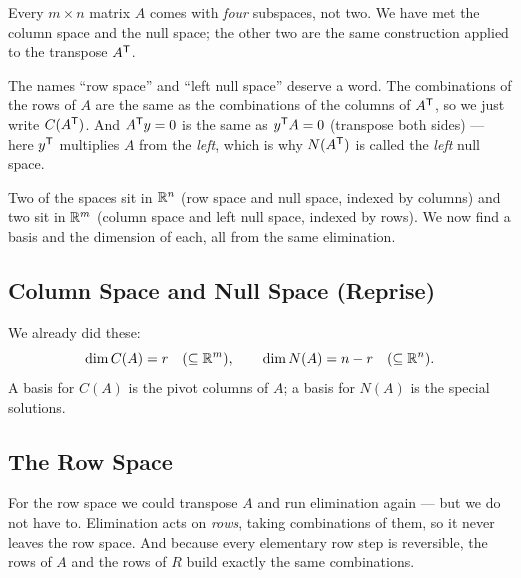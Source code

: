 Every $m\times n$ matrix $A$ comes with \emph{four} subspaces, not two. We have met the column space and the null space; the other two are the same construction applied to the transpose $A^{\mathsf T}$.


The names ``row space'' and ``left null space'' deserve a word. The combinations of the rows of $A$ are the same as the combinations of the columns of $A^{\mathsf T}$, so we just write $C(A^{\mathsf T})$. And $A^{\mathsf T} y = 0$ is the same as $y^{\mathsf T} A = 0$ (transpose both sides) --- here $y^{\mathsf T}$ multiplies $A$ from the \emph{left}, which is why $N(A^{\mathsf T})$ is called the \emph{left} null space.

Two of the spaces sit in $\mathbb{R}^n$ (row space and null space, indexed by columns) and two sit in $\mathbb{R}^m$ (column space and left null space, indexed by rows). We now find a basis and the dimension of each, all from the same elimination.

\subsection{Column Space and Null Space (Reprise)}

We already did these:
\[
   \dim C(A) = r \quad(\subseteq \mathbb{R}^m),
   \qquad
   \dim N(A) = n-r \quad(\subseteq \mathbb{R}^n).
\]
A basis for $C(A)$ is the pivot columns of $A$; a basis for $N(A)$ is the special solutions.

\subsection{The Row Space}

For the row space we could transpose $A$ and run elimination again --- but we do not have to. Elimination acts on \emph{rows}, taking combinations of them, so it never leaves the row space. And because every elementary row step is reversible, the rows of $A$ and the rows of $R$ build exactly the same combinations.

